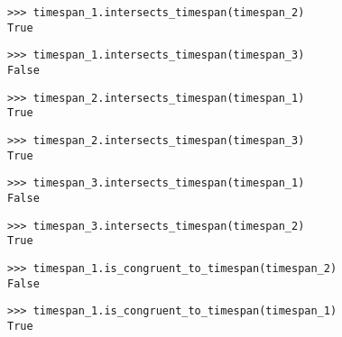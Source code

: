 \begin{comment}
<abjad>
timespan_1.intersects_timespan(timespan_2)
timespan_1.intersects_timespan(timespan_3)
timespan_2.intersects_timespan(timespan_1)
timespan_2.intersects_timespan(timespan_3)
timespan_3.intersects_timespan(timespan_1)
timespan_3.intersects_timespan(timespan_2)
</abjad>
\end{comment}

\begin{singlespacing}
\vspace{-0.5\baselineskip}
\begin{lstlisting}
>>> timespan_1.intersects_timespan(timespan_2)
True
\end{lstlisting}
\begin{lstlisting}
>>> timespan_1.intersects_timespan(timespan_3)
False
\end{lstlisting}
\begin{lstlisting}
>>> timespan_2.intersects_timespan(timespan_1)
True
\end{lstlisting}
\begin{lstlisting}
>>> timespan_2.intersects_timespan(timespan_3)
True
\end{lstlisting}
\begin{lstlisting}
>>> timespan_3.intersects_timespan(timespan_1)
False
\end{lstlisting}
\begin{lstlisting}
>>> timespan_3.intersects_timespan(timespan_2)
True
\end{lstlisting}
\end{singlespacing}

\begin{comment}
<abjad>
timespan_1.is_congruent_to_timespan(timespan_2)
timespan_1.is_congruent_to_timespan(timespan_1)
</abjad>
\end{comment}

\begin{singlespacing}
\vspace{-0.5\baselineskip}
\begin{lstlisting}
>>> timespan_1.is_congruent_to_timespan(timespan_2)
False
\end{lstlisting}
\begin{lstlisting}
>>> timespan_1.is_congruent_to_timespan(timespan_1)
True
\end{lstlisting}
\end{singlespacing}

\begin{comment}
<abjad>
timespan_1.is_tangent_to_timespan(timespan_2)
timespan_1.is_tangent_to_timespan(timespan_3)
</abjad>
\end{comment}

